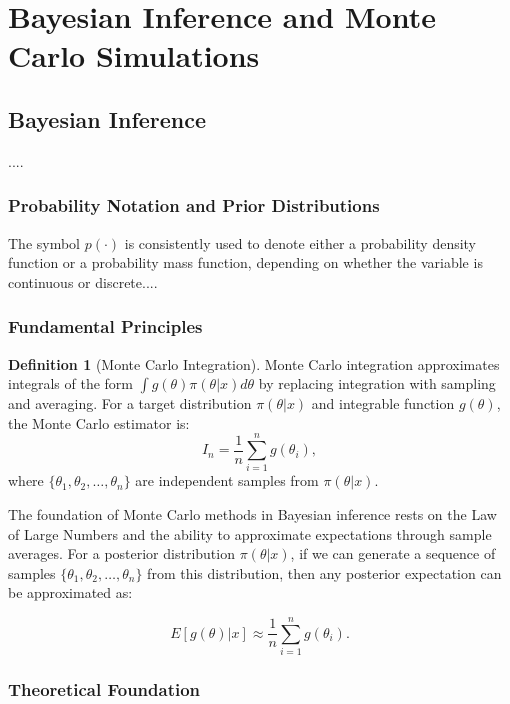 \documentclass[12pt,a4paper,oneside]{book}
\theoremstyle{definition}
\newtheorem{definition}{Definition}[section]
\begin{document}
\section{Bayesian Inference and Monte Carlo Simulations}

\subsection{Bayesian Inference}

....

\subsubsection{Probability Notation and Prior Distributions}

The symbol $p(\cdot)$ is consistently used to denote either a probability density function or a probability mass function, depending on whether the variable is continuous or discrete....

\subsubsection{Fundamental Principles}

\begin{definition}[Monte Carlo Integration]
Monte Carlo integration approximates integrals of the form $\int g(\theta)\pi(\theta|x)d\theta$ by replacing integration with sampling and averaging. For a target distribution $\pi(\theta|x)$ and integrable function $g(\theta)$, the Monte Carlo estimator is:
\begin{equation}
\hat{I}_n = \frac{1}{n}\sum_{i=1}^{n} g(\theta_i),
\end{equation}
where $\{\theta_1, \theta_2, \ldots, \theta_n\}$ are independent samples from $\pi(\theta|x)$.
\end{definition}

The foundation of Monte Carlo methods in Bayesian inference rests on the Law of Large Numbers and the ability to approximate expectations through sample averages. For a posterior distribution $\pi(\theta|x)$, if we can generate a sequence of samples $\{\theta_1, \theta_2, \ldots, \theta_n\}$ from this distribution, then any posterior expectation can be approximated as:

\begin{equation}
E[g(\theta)|x] \approx \frac{1}{n}\sum_{i=1}^{n} g(\theta_i). 
\end{equation}


\subsubsection{Theoretical Foundation}
\end{document}
